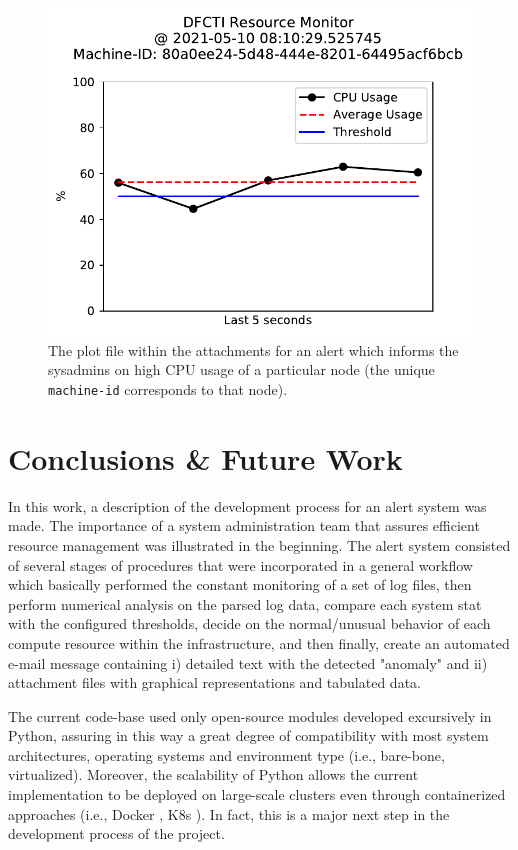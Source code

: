 \documentclass[conference]{IEEEtran}
\begin{document}
\begin{figure}[htbp]
    \centering
    \includegraphics[scale=0.6]{figs/cpu_usage.pdf}
    \caption{The plot file within the attachments for an alert which informs the sysadmins on high CPU usage of a particular node (the unique \texttt{machine-id} corresponds to that node).}
    \label{cpu-ss}
\end{figure}

\section{Conclusions \& Future Work}
\label{section-conclusions}

In this work, a description of the development process for an alert system was made. The importance of a system administration team that assures efficient resource management was illustrated in the beginning. The alert system consisted of several stages of procedures that were incorporated in a general workflow which basically performed the constant monitoring of a set of log files, then perform numerical analysis on the parsed log data, compare each system stat with the configured thresholds, decide on the normal/unusual behavior of each compute resource within the infrastructure, and then finally, create an automated e-mail message containing i) detailed text with the detected "anomaly" and ii) attachment files with graphical representations and tabulated data.
\par The current code-base used only open-source modules developed excursively in Python, assuring in this way a great degree of compatibility with most system architectures, operating systems and environment type (i.e., bare-bone, virtualized). Moreover, the scalability of Python allows the current implementation to be deployed on large-scale clusters even through containerized approaches (i.e., Docker \cite{merkel2014docker}, K8s \cite{brewer2015kubernetes}). In fact, this is a major next step in the development process of the project.
\end{document}
